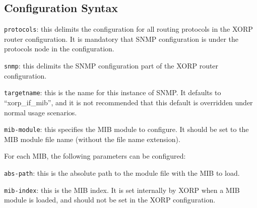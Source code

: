 \subsection{Configuration Syntax}
\vspace{0.1in}
\noindent{}
\vspace{0.1in}

\begin{description}

  \item {\tt protocols}: this delimits the configuration for all routing
   protocols in the XORP router configuration.  It is mandatory that
   SNMP configuration is under the {\stt protocols} node in the
   configuration.

  \item {\tt snmp}: this delimits the SNMP configuration part of the XORP
   router configuration.

  \item {\tt targetname}: this is the name for this instance of SNMP.
   It defaults to ``{\stt xorp\_if\_mib}'', and it is not recommended
   that this default is overridden under normal usage scenarios.

  \item {\tt mib-module}: this specifies the MIB module to configure. It
  should be set to the MIB module file name (without the file name extension).

  For each MIB, the following parameters can be configured:

  \begin{description}

    \item {\tt abs-path}: this is the absolute path to the module file with
    the MIB to load.

    \item {\tt mib-index}: this is the MIB index. It is set internally by
    XORP when a MIB module is loaded, and should not be set in the XORP
    configuration.

  \end{description}

\end{description}

